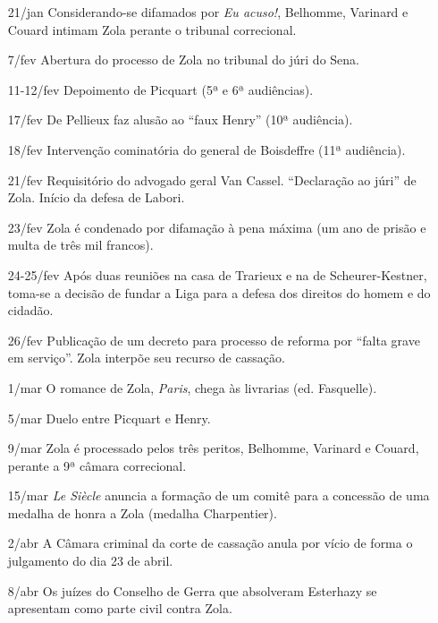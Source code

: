 \begin{itemize}
\item[21/jan] Considerando-se difamados por \textit{Eu acuso!}, Belhomme,
Varinard e Couard intimam Zola perante o tribunal correcional.

\item[7/fev] Abertura do processo de Zola no tribunal do júri do Sena. 

\item[11-12/fev] Depoimento de Picquart (5ª e 6ª audiências). 

\item[17/fev] De Pellieux faz alusão ao ``faux Henry'' (10ª audiência).

\item[18/fev] Intervenção cominatória do general de Boisdeffre (11ª audiência). 

\item[21/fev] Requisitório do advogado geral Van Cassel. ``Declaração ao júri''
de Zola. Início da defesa de Labori.

\item[23/fev] Zola é condenado por difamação à pena máxima (um ano de prisão e
multa de três mil francos). 

\item[24-25/fev] Após duas reuniões na casa de Trarieux e na de
Scheurer-Kestner, toma-se a decisão de fundar a Liga para a defesa dos direitos
do homem e do cidadão. 

\item[26/fev] Publicação de um decreto para processo de reforma por ``falta
grave em serviço''. Zola interpõe seu recurso de cassação. 

\item[1/mar] O romance de Zola, \textit{Paris}, chega às livrarias (ed.
Fasquelle).

\item[5/mar] Duelo entre Picquart e Henry.

\item[9/mar] Zola é processado pelos três peritos, Belhomme, Varinard e Couard,
perante a 9ª câmara correcional.  

\item[15/mar] \textit{Le Siècle} anuncia a formação de um comitê para a
concessão de uma medalha de honra a Zola (medalha Charpentier).  

\item[2/abr] A Câmara criminal da corte de cassação anula por vício de forma o
julgamento do dia 23 de abril.
 
\item[8/abr] Os juízes do Conselho de Gerra que absolveram Esterhazy se
apresentam como parte civil contra Zola.


\end{itemize}
